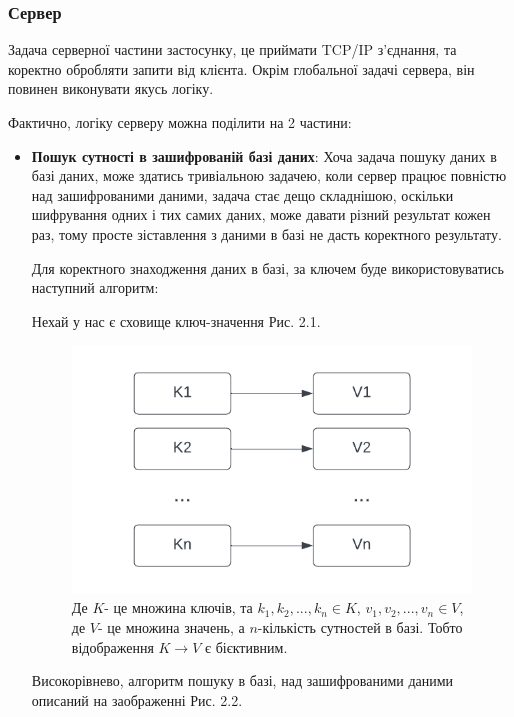 \subsubsection*{Сервер}
Задача серверної частини застосунку, це приймати TCP/IP з'єднання, та коректно обробляти 
запити від клієнта. Окрім глобальної задачі сервера, він повинен виконувати якусь логіку.

Фактично, логіку серверу можна поділити на 2 частини:
\begin{itemize}
    \item{\textbf{Пошук сутності в зашифрованій базі даних}: Хоча задача пошуку даних в базі
даних, може здатись тривіальною задачею, коли сервер працює повністю над зашифрованими даними,
задача стає дещо складнішою, оскільки шифрування одних і тих самих даних, може давати різний
результат кожен раз, тому просте зіставлення з даними в базі не дасть коректного результату.

Для коректного знаходження даних в базі, за ключем буде використовуватись наступний алгоритм:

Нехай у нас є сховище ключ-значення Рис. 2.1.


\begin{figure}[!ht]
    \centering
    \label{fig:key-value-storage}
    \includegraphics[scale=1.25]{static/key-value-storage.png}
    \caption{Де \(K\)- це множина ключів, та \(k_1,k_2,...,k_n \in K\), \(v_1, v_2,...,v_n 
    \in V\), де \(V\)- це множина значень, а \(n\)-кількість сутностей в базі. Тобто
    відображення \(K \rightarrow V\) є бієктивним.}
\end{figure}

    Високорівнево, алгоритм пошуку в базі, над зашифрованими даними описаний на заображенні
    Рис. 2.2.

}
\end{itemize}
